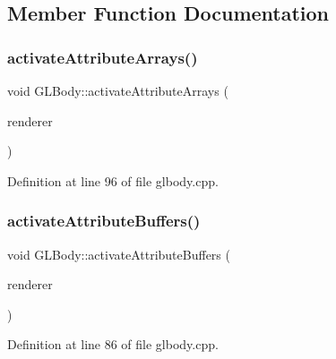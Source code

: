 \subsection{Member Function Documentation}
\mbox{\label{class_g_l_body_a2d1dcd40bdc2d1d50b70f2807a67f9a3}} 
\subsubsection{\texorpdfstring{activateAttributeArrays()}{activateAttributeArrays()}}
{\footnotesize\ttfamily void G\+L\+Body\+::activate\+Attribute\+Arrays (\begin{DoxyParamCaption}\item[{\mbox{\hyperlink{class_g_l_e_s_renderer}{G\+L\+E\+S\+Renderer}} $\ast$}]{renderer }\end{DoxyParamCaption})\hspace{0.3cm}{\ttfamily [protected]}}



Definition at line 96 of file glbody.\+cpp.

\mbox{\label{class_g_l_body_a35f619d585501cb1ac0945586afb9fa1}} 
\subsubsection{\texorpdfstring{activateAttributeBuffers()}{activateAttributeBuffers()}}
{\footnotesize\ttfamily void G\+L\+Body\+::activate\+Attribute\+Buffers (\begin{DoxyParamCaption}\item[{\mbox{\hyperlink{class_g_l_e_s_renderer}{G\+L\+E\+S\+Renderer}} $\ast$}]{renderer }\end{DoxyParamCaption})\hspace{0.3cm}{\ttfamily [protected]}}



Definition at line 86 of file glbody.\+cpp.

\mbox{\label{class_g_l_body_abb7d94cef839384559975654a9729a2f}} 

